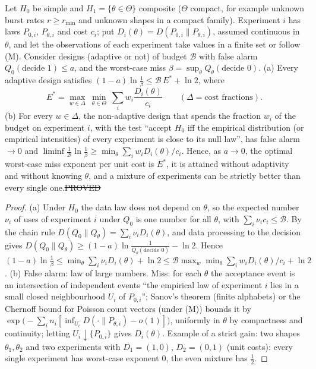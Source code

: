 \begin{theorem}\label{thm:composite}
Let $H_0$ be simple and $H_1=\{\theta\in\Theta\}$ composite ($\Theta$ compact, for example unknown burst rates $r\ge r_{\min}$ and unknown shapes in a compact family). Experiment $i$ has laws $P_{0,i}$, $P_{\theta,i}$ and cost $c_i$; put $D_i(\theta)=D(P_{0,i}\|P_{\theta,i})$, assumed continuous in $\theta$, and let the observations of each experiment take values in a finite set or follow (M). Consider designs (adaptive or not) of budget $\mathcal B$ with false alarm $Q_0(\text{decide }1)\le a$, and the worst-case miss $\beta=\sup_\theta Q_\theta(\text{decide }0)$.
(a) Every adaptive design satisfies $(1-a)\ln\frac1\beta\le\mathcal B\,E^\ast+\ln2$, where
\[
E^\ast=\max_{w\in\Delta}\ \min_{\theta\in\Theta}\ \sum_iw_i\frac{D_i(\theta)}{c_i}\qquad(\Delta=\text{cost fractions}).
\]
(b) For every $w\in\Delta$, the non-adaptive design that spends the fraction $w_i$ of the budget on experiment $i$, with the test ``accept $H_0$ iff the empirical distribution (or empirical intensities) of every experiment is close to its null law'', has false alarm $\to0$ and $\liminf\frac1{\mathcal B}\ln\frac1\beta\ge\min_\theta\sum_iw_iD_i(\theta)/c_i$.
Hence, as $a\to0$, the optimal worst-case miss exponent per unit cost is $E^\ast$, it is attained without adaptivity and without knowing $\theta$, and a mixture of experiments can be strictly better than every single one.\hfill\st{PROVED}
\end{theorem}
\begin{proof}
(a) Under $H_0$ the data law does not depend on $\theta$, so the expected number $\nu_i$ of uses of experiment $i$ under $Q_0$ is one number for all $\theta$, with $\sum_i\nu_ic_i\le\mathcal B$. By the chain rule $D(Q_0\|Q_\theta)=\sum_i\nu_iD_i(\theta)$, and data processing to the decision gives $D(Q_0\|Q_\theta)\ge(1-a)\ln\frac1{Q_\theta(\text{decide }0)}-\ln2$. Hence $(1-a)\ln\frac1\beta\le\min_\theta\sum_i\nu_iD_i(\theta)+\ln2\le\mathcal B\max_w\min_\theta\sum_iw_iD_i(\theta)/c_i+\ln2$.
(b) False alarm: law of large numbers. Miss: for each $\theta$ the acceptance event is an intersection of independent events ``the empirical law of experiment $i$ lies in a small closed neighbourhood $U_i$ of $P_{0,i}$''; Sanov's theorem (finite alphabets) or the Chernoff bound for Poisson count vectors (under (M)) bounds it by $\exp\big(-\sum_in_i[\inf_{U_i}D(\cdot\|P_{\theta,i})-o(1)]\big)$, uniformly in $\theta$ by compactness and continuity; letting $U_i\downarrow\{P_{0,i}\}$ gives $D_i(\theta)$. Example of a strict gain: two shapes $\theta_1,\theta_2$ and two experiments with $D_1=(1,0)$, $D_2=(0,1)$ (unit costs): every single experiment has worst-case exponent $0$, the even mixture has $\tfrac12$.
\end{proof}

